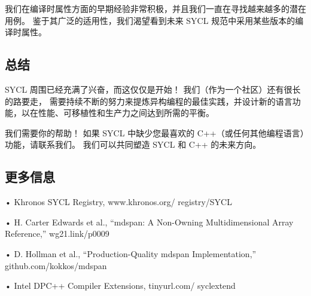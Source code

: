 我们在编译时属性方面的早期经验非常积极，并且我们一直在寻找越来越多的潜在用例。 
鉴于其广泛的适用性，我们渴望看到未来 SYCL 规范中采用某些版本的编译时属性。

\subsection{总结}
SYCL 周围已经充满了兴奋，而这仅仅是开始！ 我们（作为一个社区）还有很长的路要走，
需要持续不断的努力来提炼异构编程的最佳实践，并设计新的语言功能，以在性能、可移植性和生产力之间达到所需的平衡。

我们需要你的帮助！ 如果 SYCL 中缺少您最喜欢的 C++（或任何其他编程语言）功能，请联系我们。 
我们可以共同塑造 SYCL 和 C++ 的未来方向。

\subsection{更多信息}
• Khronos SYCL Registry, www.khronos.org/ registry/SYCL

• H. Carter Edwards et al., “mdspan: A Non-Owning Multidimensional Array Reference,” wg21.link/p0009

• D. Hollman et al., “Production-Quality mdspan Implementation,” github.com/kokkos/mdspan

• Intel DPC++ Compiler Extensions, tinyurl.com/ syclextend